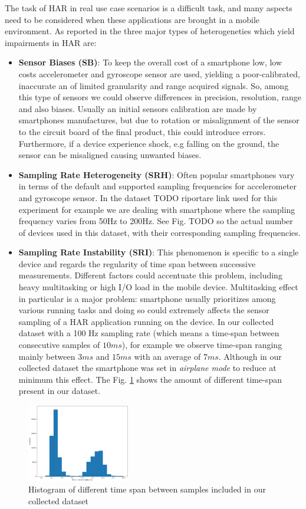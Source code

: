 The task of HAR in real use case scenarios is a difficult task, and many aspects need to be considered when these applications are brought in a mobile environment. As reported in \cite{blunck2013heterogeneity} the three major types of heterogeneties which yield impairments in HAR are:
\begin{itemize}
	\item \textbf{Sensor Biases (SB)}: To keep the overall cost of a smartphone low, low costs accelerometer and gyroscope sensor are used, yielding a poor-calibrated, inaccurate an of limited granularity and range acquired signals. So, among this type of sensors we could observe differences in precision, resolution, range and also biases. Usually an initial sensors calibration are made by smartphones manufactures, but due to rotation or misalignment of the sensor to the circuit board of the final product, this could introduce errors. Furthermore, if a device experience shock, e.g falling on the ground, the sensor can be misaligned causing unwanted biases.
	\item \textbf{Sampling Rate Heterogeneity (SRH)}: Often popular smartphones vary in terms of the default and supported sampling frequencies for accelerometer and gyroscope sensor. In the dataset TODO riportare link used for this experiment for example we are dealing with smartphone where the sampling frequency varies from 50Hz to 200Hz. See Fig. TODO so the actual number of devices used in this dataset, with their corresponding sampling frequencies.
	\item \textbf{Sampling Rate Instability (SRI)}: This phenomenon is specific to a single device and regards the regularity of time span between successive measurements. Different factors could accentuate this problem, including heavy multitasking or high I/O load in the mobile device. Multitasking effect in particular is a major problem: smartphone usually prioritizes among various running tasks and doing so could extremely affects the sensor sampling of a HAR application running on the device. In our collected dataset with a 100 Hz sampling rate (which means a time-span between consecutive samples of $10ms$), for example we observe time-span ranging mainly between $3ms$ and $15ms$ with an average of $7ms$. Although in our collected dataset the smartphone was set in \textit{airplane mode} to reduce at minimum this effect. The Fig. \ref{time-span} shows the amount of different time-span present in our dataset.
\end{itemize}

\begin{figure}[h]
	\centering
	\includegraphics[width=0.4\textwidth]{images/interval_samples.png}
	\caption{Histogram of different time span between samples included in our collected dataset}
	\label{time-span}
\end{figure}

